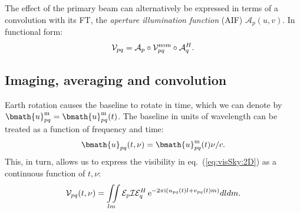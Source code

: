 \documentclass[useAMS,usenatbib]{mn2e}
\newcommand{\ee}{\mathrm{e}}
\newcommand{\ii}{\mathrm{i}}
\begin{document}
The effect of the primary beam can alternatively be expressed in terms of a convolution with its FT, the \emph{aperture 
illumination function} (AIF) $\mathcal{A}_p(u,v)$. In functional form:
\begin{equation}
\mathcal{V}_{pq} = \mathcal{A}_p \circ \mathcal{V}^\mathrm{nom}_{pq} \circ \mathcal{A}_q^H.\label{eq:visSky:conv}
\end{equation} 



\subsection{Imaging, averaging and convolution}

\label{sec:AvgCon}
Earth rotation causes the baseline to rotate in time, which we can denote by
$\bmath{u}^\mathrm{m}_{pq}=\bmath{u}^\mathrm{m}_{pq}(t)$. The baseline in units of wavelength 
can be treated as a function of frequency and time:
\begin{equation}
\label{eq:uvtf}
\bmath{u}_{pq}(t,\nu) = \bmath{u}^\mathrm{m}_{pq}(t)\nu/c.
\end{equation} 
This, in turn, allows us to express the visibility in eq.~(\ref{eq:visSky:2D}) as 
a continuous function of $t,\nu$:
\begin{equation}
\VV_{pq}(t,\nu)=\iint\limits_{lm} \EE_p \II \EE_q^H\,\ee^{-2\pi\ii(u_{pq}(t)l+v_{pq}(t)m)}dldm. \label{eq:visSky:2Dtf}
\end{equation} 
\end{document}

